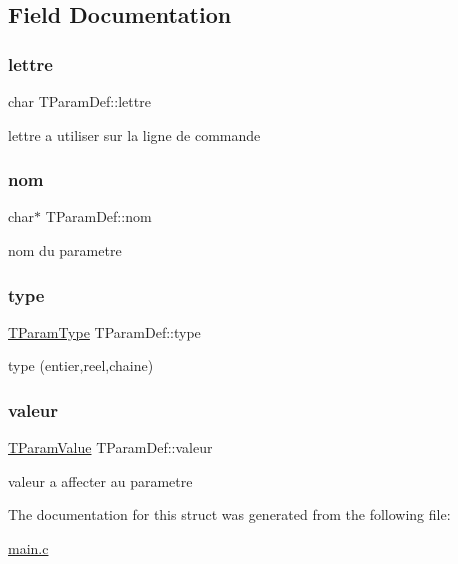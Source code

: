 \subsection{Field Documentation}
\mbox{\label{structTParamDef_a66254f6368c5542d3f14afdd1ea1e621}} 
\subsubsection{\texorpdfstring{lettre}{lettre}}
{\footnotesize\ttfamily char T\+Param\+Def\+::lettre}

lettre a utiliser sur la ligne de commande \mbox{\label{structTParamDef_afa78db012abc7fecd18c60d6154e04f8}} 
\subsubsection{\texorpdfstring{nom}{nom}}
{\footnotesize\ttfamily char$\ast$ T\+Param\+Def\+::nom}

nom du parametre \mbox{\label{structTParamDef_aaa8c69f39c6dd02a968dc15044810327}} 
\subsubsection{\texorpdfstring{type}{type}}
{\footnotesize\ttfamily \hyperlink{main_8c_a07d4e5a29d675892ddc5f377533c06a5}{T\+Param\+Type} T\+Param\+Def\+::type}

type (entier,reel,chaine) \mbox{\label{structTParamDef_a3f5cbf75e393d35bb230dfe293f7c7ba}} 
\subsubsection{\texorpdfstring{valeur}{valeur}}
{\footnotesize\ttfamily \hyperlink{unionTParamValue}{T\+Param\+Value} T\+Param\+Def\+::valeur}

valeur a affecter au parametre 

The documentation for this struct was generated from the following file\+:\begin{DoxyCompactItemize}
\item 
\hyperlink{main_8c}{main.\+c}\end{DoxyCompactItemize}
